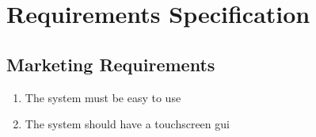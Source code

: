 \section{Requirements Specification}

\subsection{Marketing Requirements}
\begin{enumerate}
    \item The system must be easy to use
    \item The system should have a touchscreen gui
\end{enumerate}



